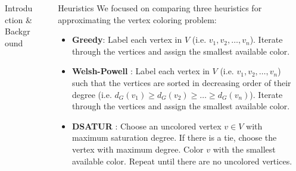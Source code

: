 \documentclass[final]{beamer}
\newlength{\sepwid}
\newlength{\smallsepwid}
\newlength{\onecolwid}
\newlength{\twocolwid}
\newlength{\halfcolwid}
\begin{document}
\begin{frame}[t]
\begin{columns}[t]
\begin{column}{\onecolwid}
\begin{block}{Introduction \& Background}
      \end{block}
  \end{column}

  \begin{column}{\sepwid}\end{column}			%

  \begin{column}{\twocolwid}

    \begin{columns}
      \begin{column}{\halfcolwid}
        \begin{block}{Heuristics}
          We focused on comparing three heuristics for approximating the vertex coloring problem:
          \begin{itemize}
            \setlength\itemsep{0.4em}
            \item \textbf{Greedy}: Label each vertex in $V$ (i.e. $v_1,v_2,\ldots,v_n$). Iterate through the vertices and assign the smallest available color.
            \item \textbf{Welsh-Powell} \cite{welsh}: Label each vertex in $V$ (i.e. $v_1,v_2,\ldots,v_n$) such that the vertices are sorted in decreasing order of their degree (i.e. $d_G(v_1) \geq d_G(v_2) \geq \ldots \geq d_G(v_n) $). Iterate through the vertices and assign the smallest available color.
            \item \textbf{DSATUR} \cite{brelaz}: Choose an uncolored vertex $v \in V$ with maximum saturation degree. If there is a tie, choose the vertex with maximum degree. Color $v$ with the smallest available color. Repeat until there are no uncolored vertices.
          \end{itemize}
        \end{block}
      \end{column}

      \begin{column}{\smallsepwid}\end{column}			%


\end{columns}
\end{column}
\end{columns}
\end{frame}
\end{document}
